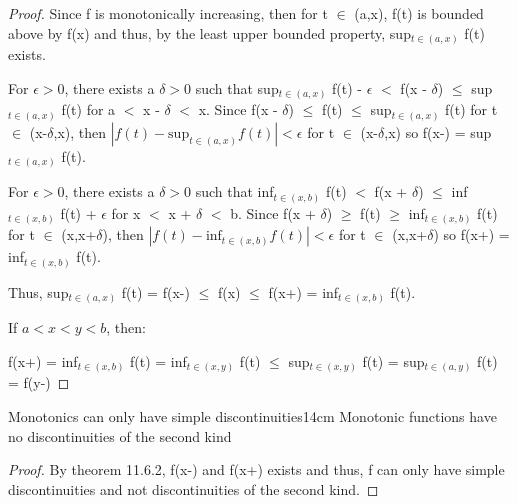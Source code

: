     \begin{proof}
        \small
        Since f is monotonically increasing, then for t $\in$ (a,x),
        f(t) is bounded above by f(x) and thus, by the least upper bounded
        property, sup$_{t \in (a,x)}$ f(t) exists.

        For $\epsilon > 0$, there exists a $\delta > 0$ such that
        sup$_{t \in (a,x)}$ f(t) - $\epsilon$
        $<$ f(x - $\delta$)
        $\leq$ sup$_{t \in (a,x)}$ f(t)
        for a $<$ x - $\delta$ $<$ x.
        Since f(x - $\delta$) $\leq$ f(t) $\leq$ sup$_{t \in (a,x)}$ f(t)
        for t $\in$ (x-$\delta$,x), then
        $|f(t) - \text{sup}_{t \in (a,x)} f(t)| < \epsilon$ for
        t $\in$ (x-$\delta$,x) so f(x-) = sup$_{t \in (a,x)}$ f(t).

        For $\epsilon > 0$, there exists a $\delta > 0$ such that
        inf$_{t \in (x,b)}$ f(t)
        $<$ f(x + $\delta$)
        $\leq$ inf$_{t \in (x,b)}$ f(t) + $\epsilon$
        for x $<$ x + $\delta$ $<$ b.
        Since f(x + $\delta$) $\geq$ f(t) $\geq$ inf$_{t \in (x,b)}$ f(t)
        for t $\in$ (x,x+$\delta$), then
        $|f(t) - \text{inf}_{t \in (x,b)} f(t)| < \epsilon$ for
        t $\in$ (x,x+$\delta$) so f(x+) = inf$_{t \in (x,b)}$ f(t).

        Thus,
        sup$_{t \in (a,x)}$ f(t) = f(x-)
        $\leq$ f(x)
        $\leq$ f(x+) = inf$_{t \in (x,b)}$ f(t).

        If $a < x < y < b$, then:

        \hspace{1cm}
        f(x+) = inf$_{t \in (x,b)}$ f(t)
        = inf$_{t \in (x,y)}$ f(t)
        $\leq$ sup$_{t \in (x,y)}$ f(t)
        = sup$_{t \in (a,y)}$ f(t)
        = f(y-)
    \end{proof}

    \newpage



    \begin{corollary}{Monotonics can only have simple discontinuities}{14cm}
        Monotonic functions have no discontinuities of the second kind
    \end{corollary}

    \begin{proof}
        By {\color{red} theorem 11.6.2}, f(x-) and f(x+) exists and thus,
        f can only have simple discontinuities and not discontinuities
        of the second kind.
    \end{proof}

    \vspace{0.5cm}




